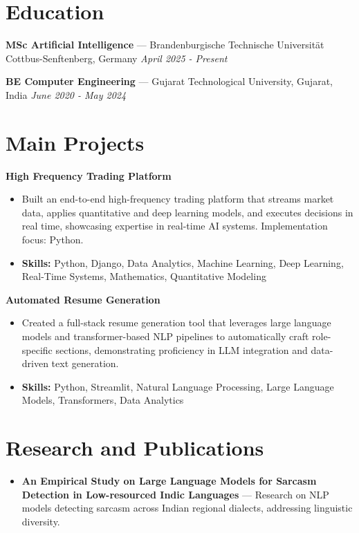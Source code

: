 \documentclass[a4paper,10pt]{article}
\begin{document}
\section*{Education}
\textbf{MSc Artificial Intelligence} — Brandenburgische Technische Universität Cottbus-Senftenberg, Germany \hfill \textit{April 2025 - Present}\par
\vspace{1.5pt}
\textbf{BE Computer Engineering} — Gujarat Technological University, Gujarat, India \hfill \textit{June 2020 - May 2024}\par

\section*{Main Projects}
\textbf{High Frequency Trading Platform}\par
\vspace{1pt}
\begin{itemize}
  \item Built an end-to-end high-frequency trading platform that streams market data, applies quantitative and deep learning models, and executes decisions in real time, showcasing expertise in real-time AI systems. Implementation focus: Python.
  \item \textbf{Skills:} Python, Django, Data Analytics, Machine Learning, Deep Learning, Real-Time Systems, Mathematics, Quantitative Modeling
\end{itemize}
\vspace{3pt}
\textbf{Automated Resume Generation}\par
\vspace{1pt}
\begin{itemize}
  \item Created a full-stack resume generation tool that leverages large language models and transformer-based NLP pipelines to automatically craft role-specific sections, demonstrating proficiency in LLM integration and data-driven text generation.
  \item \textbf{Skills:} Python, Streamlit, Natural Language Processing, Large Language Models, Transformers, Data Analytics
\end{itemize}

\section*{Research and Publications}
\begin{itemize}
\item \textbf{An Empirical Study on Large Language Models for Sarcasm Detection in Low-resourced Indic Languages} — Research on NLP models detecting sarcasm across Indian regional dialects, addressing linguistic diversity.
\end{itemize}
\end{document}
